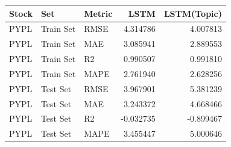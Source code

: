 \begin{tabular}{lllrr}
\toprule
Stock & Set & Metric & LSTM & LSTM(Topic) \\
\midrule
PYPL & Train Set & RMSE & 4.314786 & 4.007813 \\
PYPL & Train Set & MAE & 3.085941 & 2.889553 \\
PYPL & Train Set & R2 & 0.990507 & 0.991810 \\
PYPL & Train Set & MAPE & 2.761940 & 2.628256 \\
PYPL & Test Set & RMSE & 3.967901 & 5.381239 \\
PYPL & Test Set & MAE & 3.243372 & 4.668466 \\
PYPL & Test Set & R2 & -0.032735 & -0.899467 \\
PYPL & Test Set & MAPE & 3.455447 & 5.000646 \\
\bottomrule
\end{tabular}
